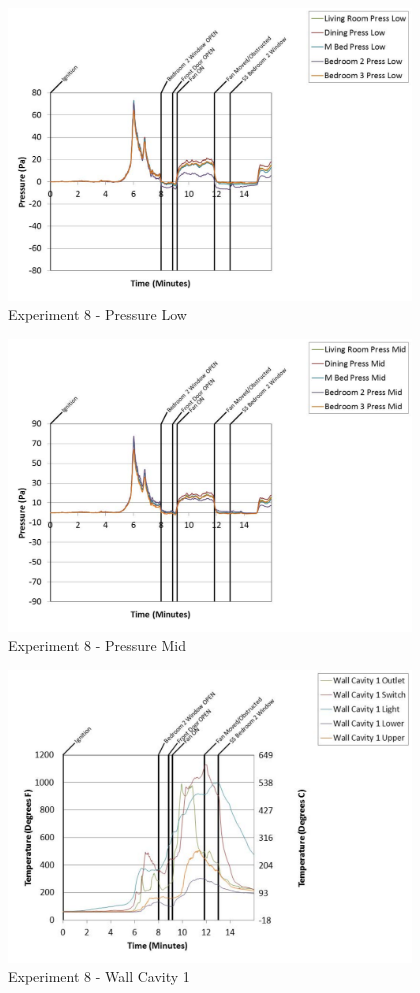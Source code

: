 \documentclass{article}
\begin{document}
\begin{appendices}
	\begin{figure}[h!]
		\centering
		\includegraphics[height=3.05in]{0_Images/Results_Charts/Exp_8_Charts/PressureLow.pdf}
		\caption{Experiment 8 - Pressure Low}
	\end{figure}
 
	\clearpage

	\begin{figure}[h!]
		\centering
		\includegraphics[height=3.05in]{0_Images/Results_Charts/Exp_8_Charts/PressureMid.pdf}
		\caption{Experiment 8 - Pressure Mid}
	\end{figure}
 

	\begin{figure}[h!]
		\centering
		\includegraphics[height=3.05in]{0_Images/Results_Charts/Exp_8_Charts/WallCavity1.pdf}
		\caption{Experiment 8 - Wall Cavity 1}
	\end{figure}
 

\end{appendices}
\end{document}
